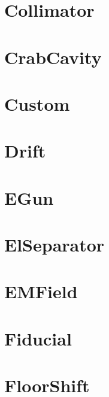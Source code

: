 \section{Collimator}
\label{s:collimator}


\section{CrabCavity}
\label{s:crab}


\section{Custom}
\label{s:custom}


\section{Drift}
\label{s:drift}


\section{EGun}
\label{s:egun}


\section{ElSeparator}
\label{s:elsep}


\section{EMField}
\label{s:emfield}


\section{Fiducial}
\label{s:fiducial}


\section{FloorShift}
\label{s:floorshift}


